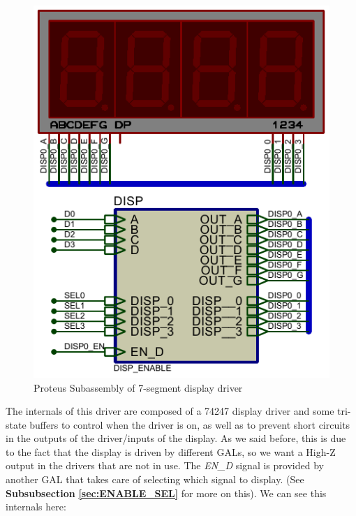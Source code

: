 \begin{figure}[H]
    \centering
    \includegraphics[scale = 0.9]{Graphics/STATE_FSM + DISPLAY/DISP_ENABLE.PDF}
    \caption{Proteus Subassembly of 7-segment display driver}
    \label{fig:DISP_ENABLE}
\end{figure}

The internals of this driver are composed of a 74247 display driver and some tri-state buffers to control when the driver is on, as well as to prevent short circuits in the outputs of the driver/inputs of the display. As we said before, this is due to the fact that the display is driven by different GALs, so we want a High-Z output in the drivers that are not in use. The \textit{EN\_D} signal is provided by another GAL that takes care of selecting which signal to display. (See \textbf{Subsubsection} \textbf{\ref{sec:ENABLE_SEL}} for more on this). We can see this internals here:

